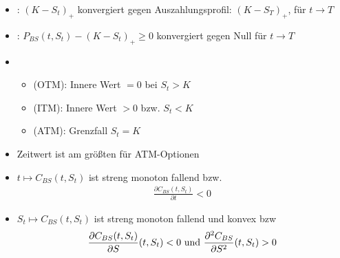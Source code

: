 \begin{itemize}
	\item {}: $(K -S_t)_+$ konvergiert gegen Auszahlungsprofil: $(K - S_T)_+$, für $t \to T$
	\item {}: $P_{BS}(t,S_t) - (K - S_t)_+ \ge 0$ konvergiert gegen Null für $t \to T$
	\item 
	\begin{itemize}
		\item {} (OTM): Innere Wert $=0$ bei $S_t > K$
		\item {} (ITM): Innere Wert $>0$ bzw. $S_t < K$
		\item {} (ATM): Grenzfall $S_t = K$
	\end{itemize}
	\item Zeitwert ist am größten für ATM-Optionen
	\item $t \mapsto C_{BS}(t,S_t)$ ist streng monoton fallend bzw.
	\begin{align*}
	\frac{\partial C_{BS}(t,S_t)}{\partial t} < 0
	\end{align*}
	\item $S_t \mapsto C_{BS}(t,S_t)$ ist streng monoton fallend und konvex bzw
	\begin{align*}
	\frac{\partial C_{BS}(t,S_t)}{\partial S}(t,S_t) < 0 \text{ und } \frac{\partial^2 C_{BS}}{\partial S^2}(t,S_t) > 0
	\end{align*}
\end{itemize}
